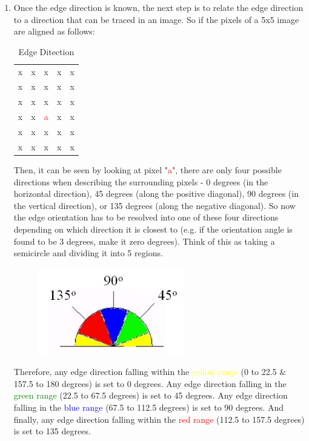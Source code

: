 \begin{enumerate}
\item Once the edge direction is known, the next step is to relate the edge direction to a direction that can be traced in an image. So if the pixels of a 5x5 image are aligned as follows: \\
\begin{table}[H]
\centering
\begin{tabular}{|c c c c c|}
\hline
x & x & x & x & x \\
x & x & x & x & x \\
x & x & x & x & x \\
x & x & \textcolor{red}{a} & x & x \\
x & x & x & x & x \\
x & x & x & x & x \\
\hline
\end{tabular}
\caption {Edge Ditection}
\label {tab:Table1}
\end{table} 
Then, it can be seen by looking at pixel "\textcolor{red}{a}", there are only four possible directions when describing the surrounding pixels - 0 degrees (in the horizontal direction), 45 degrees (along the positive diagonal), 90 degrees (in the vertical direction), or 135 degrees (along the negative diagonal). So now the edge orientation has to be resolved into one of these four directions depending on which direction it is closest to (e.g. if the orientation angle is found to be 3 degrees, make it zero degrees). Think of this as taking a semicircle and dividing it into 5 regions.
\begin{figure}[H]
\centering
\label{fig:Canny1} 
\includegraphics[width=0.6\textwidth]{Canny}
\end{figure}
Therefore, any edge direction falling within the \textcolor{yellow}{yellow range} (0 to 22.5 \& 157.5 to 180 degrees) is set to 0 degrees. Any edge direction falling in the \textcolor{green}{green range} (22.5 to 67.5 degrees) is set to 45 degrees. Any edge direction falling in the \textcolor{blue}{blue range} (67.5 to 112.5 degrees) is set to 90 degrees. And finally, any edge direction falling within the \textcolor{red}{red range} (112.5 to 157.5 degrees) is set to 135 degrees.

\end{enumerate}
